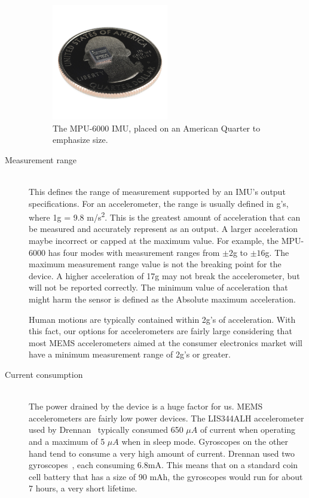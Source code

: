 \begin{description}
\begin{figure}
\begin{center}
\includegraphics[width=0.5\textwidth]{images/MPU6000Size.jpg}
\caption{The MPU-6000 IMU, placed on an American Quarter to emphasize size.}
\label{fig:MPU6000Size}
\end{center}
\end{figure}

\item[Measurement range] \hfill \\
This defines the range of measurement supported by an IMU's output specifications.
For an accelerometer, the range is usually defined in g's, where 1g = 9.8 m/s\textsuperscript{2}.
This is the greatest amount of acceleration that can be measured and accurately represent as an output.
A larger acceleration maybe incorrect or capped at the maximum value.
For example, the MPU-6000 has four modes with measurement ranges from $\pm{2}$g to $\pm{16}$g.
The maximum measurement range value is not the breaking point for the device.
A higher acceleration of 17g may not break the accelerometer, but will not be reported correctly.
The minimum value of acceleration that might harm the sensor is defined as the Absolute maximum acceleration.
 
Human motions are typically contained within 2g's of acceleration.
With this fact, our options for accelerometers are fairly large
considering that most MEMS accelerometers aimed at the consumer electronics market will have a minimum measurement range of 2g's or greater. 
\hfill 
\item[Current consumption] \hfill \\
The power drained by the device is a huge factor for us.
MEMS accelerometers are fairly low power devices.
The LIS344ALH accelerometer used by Drennan~\cite{drennan2010assessment} typically consumed 650 $\mu{A}$ of current when operating and a maximum of 5 $\mu{A}$ when in sleep mode.
Gyroscopes on the other hand tend to consume a very high amount of current.
Drennan used two gyroscopes~\cite{drennan2010assessment}, each consuming 6.8mA.
This means that on a standard coin cell battery that has a size of 90 mAh,
the gyroscopes would run for about 7 hours, a very short lifetime.


\end{description}
